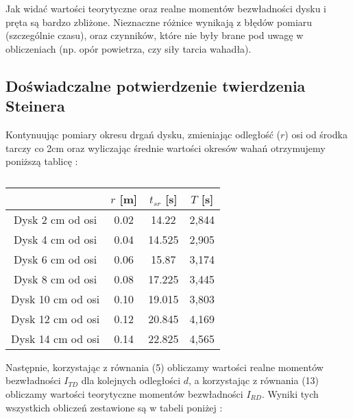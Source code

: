 \documentclass[10pt,a4paper]{article}
\newcommand{\forceindent}{\leavevmode{\parindent=3em\indent}}
\begin{document}
Jak widać wartości teorytyczne oraz realne momentów bezwładności dysku i pręta są bardzo zbliżone. Nieznaczne różnice wynikają z błędów pomiaru (szczególnie czasu), oraz czynników, które nie były brane pod uwagę w obliczeniach (np. opór powietrza, czy siły tarcia wahadła).

\subsection{Doświadczalne potwierdzenie twierdzenia Steinera}

\forceindent Kontynuując pomiary okresu drgań dysku, zmieniając odległość ($r$) osi od środka tarczy co 2cm oraz wyliczając średnie wartości okresów wahań otrzymujemy poniższą tablicę :
\begin{table}[!h]
\centering
\begin{tabular}{|c||c|c|c|}
\hline

 & $r$ [m] & $t_{sr}$ [s] & $T$ [s] \\
\hline	
\hline
Dysk 2 cm od osi& 0.02&14.22 & 2,844 \\ \hline
Dysk 4 cm od osi& 0.04&14.525 & 2,905 \\ \hline
Dysk 6 cm od osi& 0.06&15.87 & 3,174 \\ \hline
Dysk 8 cm od osi& 0.08&17.225 & 3,445 \\ \hline
Dysk 10 cm od osi& 0.10&19.015 & 3,803 \\ \hline
Dysk 12 cm od osi& 0.12&20.845 & 4,169 \\ \hline
Dysk 14 cm od osi& 0.14&22.825 & 4,565 \\ \hline

\end{tabular}
\caption{}
\end{table}
\newpage

Następnie, korzystając z równania (5) obliczamy wartości realne momentów bezwładności $I_{TD}$ dla kolejnych odległości $d$, a korzystając z równania (13) obliczamy wartości teorytyczne momentów bezwładności $I_{RD}$. Wyniki tych wszystkich obliczeń zestawione są w tabeli poniżej : 
\end{document}

